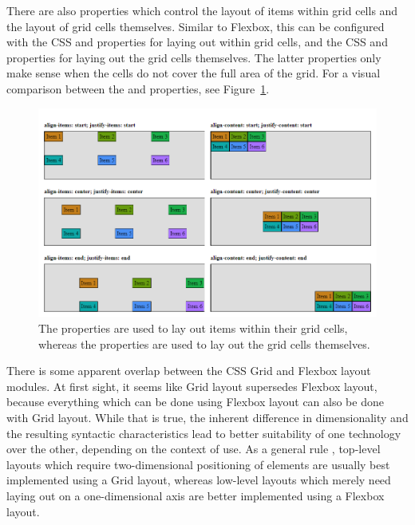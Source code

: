 There are also properties which control the layout of items within
grid cells and the layout of grid cells themselves. Similar to
Flexbox, this can be configured with the CSS  and
 properties for laying out within grid cells,
and the CSS  and 
properties for laying out the grid cells themselves. The latter
 properties only make sense when the cells do not
cover the full area of the grid. For a visual comparison between the
 and  properties, see
Figure~\ref{fig:GridLayoutProperties}.


\begin{figure}[tp]
\centering
\includegraphics[keepaspectratio,width=\linewidth,height=\halfh]
{images/grid-layout-properties.png}
\caption[Grid Layout Property Comparision]{
The  properties are used to lay out items within
their grid cells, whereas the  properties are
used to lay out the grid cells themselves. 
}
\label{fig:GridLayoutProperties}
\end{figure}


There is some apparent overlap between the CSS Grid and Flexbox layout
modules. At first sight, it seems like Grid layout supersedes Flexbox
layout, because everything which can be done using Flexbox layout can
also be done with Grid layout. While that is true, the inherent
difference in dimensionality and the resulting syntactic
characteristics lead to better suitability of one technology over the
other, depending on the context of use. As a general rule
\parencite{CSSGridVsFlexbox}, top-level layouts which require
two-dimensional positioning of elements are usually best implemented
using a Grid layout, whereas low-level layouts which merely need
laying out on a one-dimensional axis are better implemented using a
Flexbox layout.

